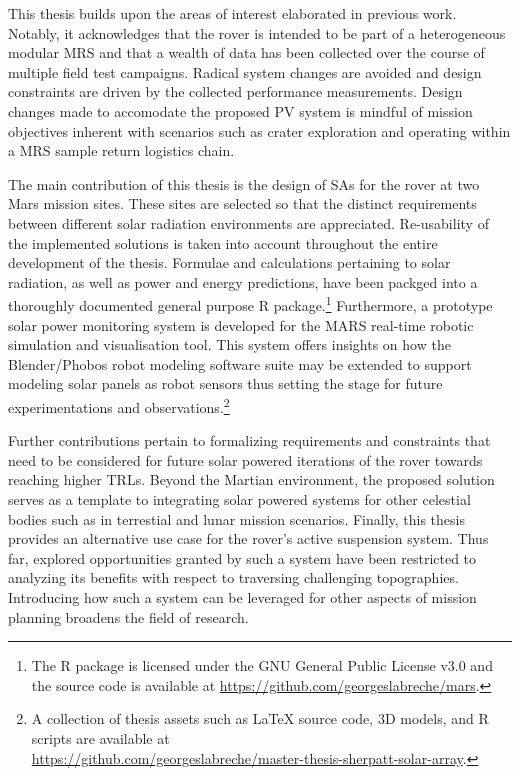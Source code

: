 This thesis builds upon the areas of interest elaborated in previous work. Notably, it acknowledges that the rover is intended to be part of a heterogeneous modular \ac{MRS} and that a wealth of data has been collected over the course of multiple field test campaigns. Radical system changes are avoided and design constraints are driven by the collected performance measurements. Design changes made to accomodate the proposed \ac{PV} system is mindful of mission objectives inherent with scenarios such as crater exploration and operating within a \ac{MRS} sample return logistics chain.

The main contribution of this thesis is the design of \acp{SA} for the rover at two Mars mission sites. These sites are selected so that the distinct requirements between different solar radiation environments are appreciated. Re-usability of the implemented solutions is taken into account throughout the entire development of the thesis. Formulae and calculations pertaining to solar radiation, as well as power and energy predictions, have been packged into a thoroughly documented general purpose R package.\footnote{The R package is licensed under the
GNU General Public License v3.0 and the source code is available at \url{https://github.com/georgeslabreche/mars}.} Furthermore, a prototype solar power monitoring system is developed for the MARS real-time robotic simulation and visualisation tool. This system offers insights on how the Blender/Phobos robot modeling software suite may be extended to support modeling solar panels as robot sensors thus setting the stage for future experimentations and observations.\footnote{A collection of thesis assets such as LaTeX source code, 3D models, and R scripts are available at\\\url{https://github.com/georgeslabreche/master-thesis-sherpatt-solar-array}.}

Further contributions pertain to formalizing requirements and constraints that need to be considered for future solar powered iterations of the rover towards reaching higher \acp{TRL}. Beyond the Martian environment, the proposed solution serves as a template to integrating solar powered systems for other celestial bodies such as in terrestial and lunar mission scenarios. Finally, this thesis provides an alternative use case for the rover's active suspension system. Thus far, explored opportunities granted by such a system have been restricted to analyzing its benefits with respect to traversing challenging topographies. Introducing how such a system can be leveraged for other aspects of mission planning broadens the field of research.
